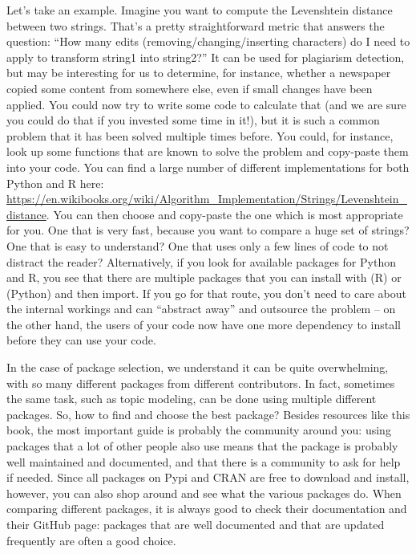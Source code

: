 Let's take an example. Imagine you want to compute the Levenshtein distance between two
strings. That's a pretty straightforward metric that answers the question: ``How many
edits (removing/changing/inserting characters) do I need to apply to transform string1 into string2?''
It can be used for plagiarism detection, but may be interesting for us to determine, for instance,
whether a newspaper copied some content from somewhere else, even if small changes have been
applied. You could now try to write some code to calculate that (and we are sure you could
do that if you invested some time in it!), but it is such a common problem that it
has been solved multiple times before. You could, for instance,  look up some
functions that are known to solve the problem and copy-paste them into your code. You can find
a large number of different implementations for both Python and R here:
\url{https://en.wikibooks.org/wiki/Algorithm_Implementation/Strings/Levenshtein\_distance}.
You can then choose and copy-paste the one which is most appropriate for you. One that is very fast, because
you want to compare a huge set of strings? One that is easy to understand? One that uses
only a few lines of code to not distract the reader?
Alternatively, if you look for available packages for Python and R, you see that there are
multiple packages that you can install with  (R) or  (Python)
and then import. If you go for that route, you don't need
to care about the internal workings and can ``abstract away'' and outsource the problem -- on the other
hand, the users of your code now have one more dependency to install before they can
use your code.

In the case of package selection, we understand it can be quite overwhelming,
with so many different packages from different contributors.
In fact, sometimes the same task, such as topic modeling,
can be done using multiple different packages.
So, how to find and choose the best package?
Besides resources like this book, the most important guide is probably the community around you:
using packages that a lot of other people also use means that the package is probably well maintained and documented,
and that there is a community to ask for help if needed.
Since all packages on Pypi and CRAN are free to download and install, however, you can also shop around and see what the various packages do.
When comparing different packages, it is always good to check their documentation and their GitHub page:
packages that are well documented and that are updated frequently are often a good choice.


